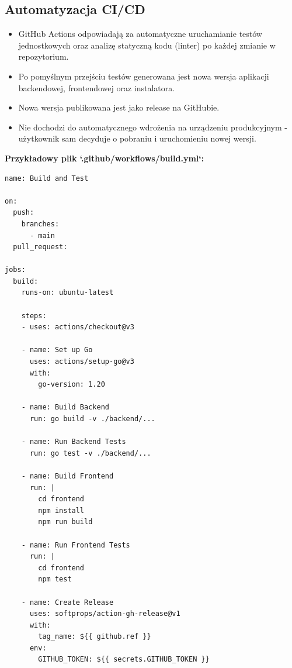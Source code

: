 \subsection{Automatyzacja CI/CD}
\begin{itemize}
    \item GitHub Actions odpowiadają za automatyczne uruchamianie testów jednostkowych oraz analizę statyczną kodu (linter) po każdej zmianie w repozytorium.
    \item Po pomyślnym przejściu testów generowana jest nowa wersja aplikacji backendowej, frontendowej oraz instalatora.
    \item Nowa wersja publikowana jest jako release na GitHubie.
    \item Nie dochodzi do automatycznego wdrożenia na urządzeniu produkcyjnym - użytkownik sam decyduje o pobraniu i uruchomieniu nowej wersji.
\end{itemize}

\textbf{Przykładowy plik `.github/workflows/build.yml`:}
\begin{lstlisting}
name: Build and Test

on:
  push:
    branches:
      - main
  pull_request:

jobs:
  build:
    runs-on: ubuntu-latest

    steps:
    - uses: actions/checkout@v3

    - name: Set up Go
      uses: actions/setup-go@v3
      with:
        go-version: 1.20

    - name: Build Backend
      run: go build -v ./backend/...

    - name: Run Backend Tests
      run: go test -v ./backend/...

    - name: Build Frontend
      run: |
        cd frontend
        npm install
        npm run build

    - name: Run Frontend Tests
      run: |
        cd frontend
        npm test

    - name: Create Release
      uses: softprops/action-gh-release@v1
      with:
        tag_name: ${{ github.ref }}
      env:
        GITHUB_TOKEN: ${{ secrets.GITHUB_TOKEN }}
\end{lstlisting}
